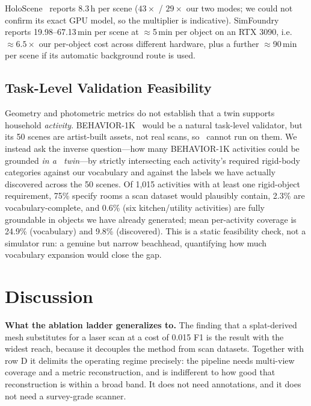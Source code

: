 HoloScene~\cite{holoscene} reports 8.3\,h per scene ($43\times$ /
$29\times$ our two modes; we could not confirm its exact GPU model, so
the multiplier is indicative). SimFoundry~\cite{simfoundry} reports
19.98--67.13\,min per scene at $\approx$5\,min per object on an RTX 3090,
i.e.\ $\approx6.5\times$ our per-object cost across different hardware,
plus a further $\approx$90\,min per scene if its automatic background
route is used.

\subsection{Task-Level Validation Feasibility}
\label{sec:behavior1k}
Geometry and photometric metrics do not establish that a twin supports
household \emph{activity}. BEHAVIOR-1K~\cite{behavior1k} would be a
natural task-level validator, but its 50 scenes are artist-built assets,
not real scans, so \name\ cannot run on them. We instead ask the inverse
question---how many BEHAVIOR-1K activities could be grounded \emph{in a
\name\ twin}---by strictly intersecting each activity's required
rigid-body categories against our vocabulary and against the labels we
have actually discovered across the 50 scenes. Of 1,015 activities with
at least one rigid-object requirement, 75\% specify rooms a scan dataset
would plausibly contain, 2.3\% are vocabulary-complete, and 0.6\% (six
kitchen/utility activities) are fully groundable in objects we have
already generated; mean per-activity coverage is 24.9\% (vocabulary) and
9.8\% (discovered). This is a static feasibility check, not a simulator
run: a genuine but narrow beachhead, quantifying how much vocabulary
expansion would close the gap.

\ifextended
\section{Discussion}

\textbf{What the ablation ladder generalizes to.} The finding that a
splat-derived mesh substitutes for a laser scan at a cost of 0.015 F1 is
the result with the widest reach, because it decouples the method from
scan datasets. Together with row D it delimits the operating regime
precisely: the pipeline needs multi-view coverage and a metric
reconstruction, and is indifferent to how good that reconstruction is
within a broad band. It does not need annotations, and it does not need a
survey-grade scanner.

